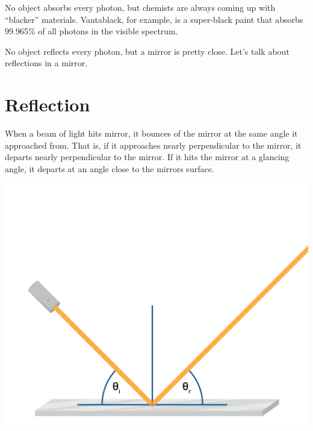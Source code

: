No object absorbs every photon, but chemists are always coming up with
``blacker'' materials. Vantablack, for example, is a super-black paint
that absorbs 99.965\% of all photons in the visible spectrum.

No object reflects every photon, but a mirror is pretty close. Let's
talk about reflections in a mirror.

\section{Reflection}

When a beam of light hits mirror, it bounces of the mirror at the same
angle it approached from.  That is, if it approaches nearly
perpendicular to the mirror, it departs nearly perpendicular to the
mirror.  If it hits the mirror at a glancing angle, it departs at an
angle close to the mirrors surface.

\includegraphics[width=1\textwidth]{reflection.png}

